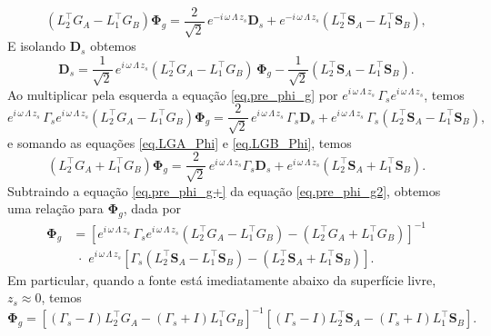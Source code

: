 \begin{equation}\label{eq.pre_phi_g}
(L_2^{\top}G_A-L_1^\top G_B)\mathbf{\Phi}_g=\frac{2}{\sqrt{2}}\,e^{-i\,\omega\,\Lambda\,z_s}\mathbf{D}_s+e^{-i\,\omega\,\Lambda\,z_s}(L_2^\top\mathbf{S}_A-L_1^\top\mathbf{S}_B),
\end{equation}
E isolando $\mathbf{D}_s$ obtemos
\begin{equation*}
\mathbf{D}_s=\frac{1}{\sqrt{2}}\,e^{i\,\omega\,\Lambda\,z_s}(L_2^{\top}G_A-L_1^\top G_B)\,\mathbf{\Phi}_g-\frac{1}{\sqrt{2}}(L_2^\top\mathbf{S}_A-L_1^\top\mathbf{S}_B).
\end{equation*}
Ao multiplicar pela esquerda a equa\c{c}\~ao \ref{eq.pre_phi_g} por $e^{i\,\omega\,\Lambda\,z_s}\,\Gamma_se^{i\,\omega\,\Lambda\,z_s}$, temos
\begin{equation}\label{eq.pre_phi_g2}
e^{i\,\omega\,\Lambda\,z_s}\,\Gamma_se^{i\,\omega\,\Lambda\,z_s}(L_2^{\top}G_A-L_1^\top G_B)\mathbf{\Phi}_g=\frac{2}{\sqrt{2}}\,e^{i\,\omega\,\Lambda\,z_s}\,\Gamma_s\mathbf{D}_s+e^{i\,\omega\,\Lambda\,z_s}\,\Gamma_s(L_2^\top\mathbf{S}_A-L_1^\top\mathbf{S}_B),
\end{equation}
e somando as equa\c{c}\~oes \ref{eq.LGA_Phi} e \ref{eq.LGB_Phi}, temos
\begin{equation}\label{eq.pre_phi_g+}
(L_2^{\top}G_A+L_1^\top G_B)\mathbf{\Phi}_g=\frac{2}{\sqrt{2}}\,e^{i\,\omega\,\Lambda\,z_s}\Gamma_s\mathbf{D}_s+e^{i\,\omega\,\Lambda\,z_s}(L_2^\top\mathbf{S}_A+L_1^\top\mathbf{S}_B).
\end{equation}
Subtraindo a equa\c{c}\~ao \ref{eq.pre_phi_g+} da equa\c{c}\~ao \ref{eq.pre_phi_g2}, obtemos uma rela\c{c}\~ao para $\mathbf{\Phi}_g$, dada por 
\begin{align*}
\mathbf{\Phi}_g&=\left[e^{i\,\omega\,\Lambda\,z_s}\,\Gamma_se^{i\,\omega\,\Lambda\,z_s}(L_2^{\top}G_A-L_1^\top G_B)-(L_2^{\top}G_A+L_1^\top G_B)\right]^{-1}\\
&\,\,\cdot\,\,e^{i\,\omega\,\Lambda\,z_s}\left[\Gamma_s (L_2^\top\mathbf{S}_A-L_1^\top\mathbf{S}_B)-(L_2^\top\mathbf{S}_A+L_1^\top\mathbf{S}_B)\right].
\end{align*}
Em particular, quando a fonte est\'a imediatamente abaixo da superf\'icie livre, $z_s\approx0$, temos
\begin{equation*}
\mathbf{\Phi}_g=\left[(\Gamma_s-I)L_2^{\top}G_A-(\Gamma_s+I)L_1^\top G_B\right]^{-1}\left[(\Gamma_s-I)L_2^\top\mathbf{S}_A-(\Gamma_s+I)L_1^\top\mathbf{S}_B\right].
\end{equation*} 
